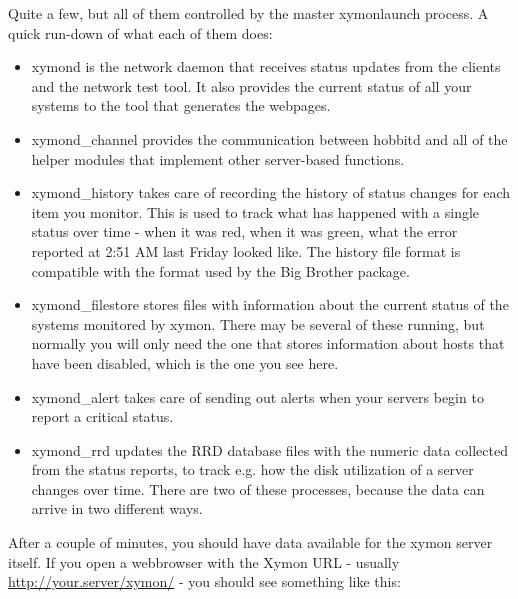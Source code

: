  Quite a few, but all of them controlled by the master xymonlaunch
 process. A quick run-down of what each of them does:

\begin{itemize}
\item xymond is the network daemon that receives status updates from
  the clients and the network test tool. It also provides the current
  status of all your systems to the tool that generates the webpages.

\item xymond\_channel provides the communication between hobbitd and
  all of the helper modules that implement other server-based
  functions.

\item xymond\_history takes care of recording the history of status
  changes for each item you monitor. This is used to track what has
  happened with a single status over time - when it was red, when it
  was green, what the error reported at 2:51 AM last Friday looked
  like. The history file format is compatible with the format used by
  the Big Brother package.

\item xymond\_filestore stores files with information about the
  current status of the systems monitored by xymon. There may be
  several of these running, but normally you will only need the one
  that stores information about hosts that have been disabled, which
  is the one you see here.

\item xymond\_alert takes care of sending out alerts when your
  servers begin to report a critical status.

\item xymond\_rrd updates the RRD database files with the numeric
  data collected from the status reports, to track e.g. how the disk
  utilization of a server changes over time. There are two of these
  processes, because the data can arrive in two different ways.


\end{itemize}


 After a couple of minutes, you should have data available for the
 xymon server itself. If you open a webbrowser with the Xymon URL -
 usually \url{http://your.server/xymon/} - you should see something
 like this:


